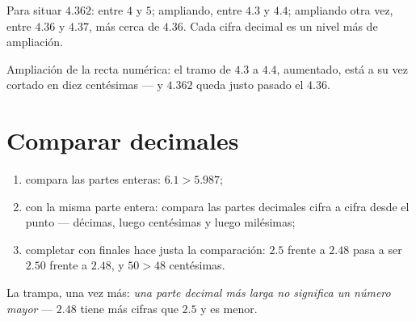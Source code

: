 \begin{example}\label{ex:g5:decimals:line}
Para situar $4.362$: entre $4$ y $5$; ampliando, entre $4.3$ y
$4.4$; ampliando otra vez, entre $4.36$ y $4.37$, más cerca de $4.36$.
Cada cifra decimal es un nivel más de ampliación.
\end{example}

\begin{omfigure}

{\small Ampliación de la recta numérica: el tramo de $4.3$ a $4.4$,
aumentado, está a su vez cortado en diez centésimas --- y $4.362$ queda
justo pasado el $4.36$.}
\end{omfigure}

\section{Comparar decimales}

\begin{method}\label{met:g5:decimals:compare}
\begin{enumerate}
  \item compara las partes enteras: $6.1 > 5.987$;
  \item con la misma parte entera: compara las partes decimales cifra a cifra
        desde el punto --- décimas, luego centésimas y luego
        milésimas;
  \item completar con  finales hace justa la comparación:
        $2.5$ frente a $2.48$ pasa a ser $2.50$ frente a $2.48$, y $50 > 48$
        centésimas.
\end{enumerate}
La trampa, una vez más: \emph{una parte decimal más larga no significa un
número mayor} --- $2.48$ tiene más cifras que $2.5$ y es menor.
\end{method}

